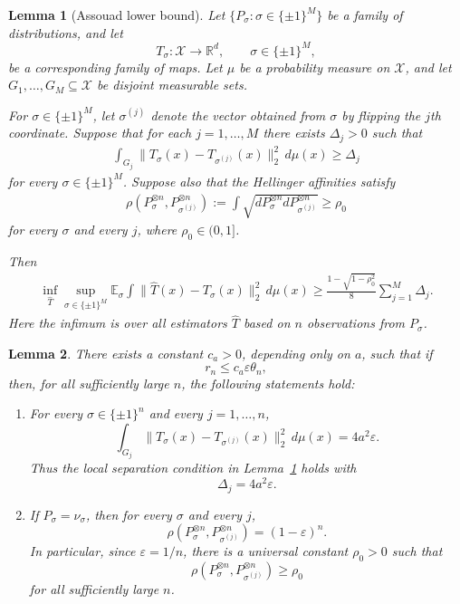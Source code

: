 \documentclass[10pt,a4paper]{amsart}
\newtheorem{lemma}{Lemma}
\begin{document}
\begin{lemma}[Assouad lower bound]
\label{lem:assouad-map-hellinger}
Let $\{P_\sigma:\sigma\in\{\pm1\}^M\}$ be a family of distributions, and let
\[
T_\sigma:\mathcal X\to\mathbb R^d,
\qquad \sigma\in\{\pm1\}^M,
\]
be a corresponding family of maps. Let $\mu$ be a probability measure on
$\mathcal X$, and let $G_1,\ldots,G_M\subseteq\mathcal X$ be disjoint
measurable sets.

For $\sigma\in\{\pm1\}^M$, let $\sigma^{(j)}$ denote the vector obtained
from $\sigma$ by flipping the $j$th coordinate. Suppose that for each
$j=1,\ldots,M$ there exists $\Delta_j>0$ such that
\begin{align}
\label{eq:assouad-local-separation}
\int_{G_j}
\|T_\sigma(x)-T_{\sigma^{(j)}}(x)\|_2^2\,d\mu(x)
\geq
\Delta_j
\end{align}
for every $\sigma\in\{\pm1\}^M$. Suppose also that the Hellinger
affinities satisfy
\begin{align}
\label{eq:assouad-affinity}
\rho(P_\sigma^{\otimes n},P_{\sigma^{(j)}}^{\otimes n})
:=
\int \sqrt{dP_\sigma^{\otimes n} dP^{\otimes n}_{\sigma^{(j)}}}
\geq
\rho_0
\end{align}
for every $\sigma$ and every $j$, where $\rho_0\in(0,1]$.

Then
\begin{align}
\label{eq:assouad-map-conclusion}
\inf_{\widehat T}
\sup_{\sigma\in\{\pm1\}^M}
\mathbb E_\sigma
\int
\|\widehat T(x)-T_\sigma(x)\|_2^2\,d\mu(x)
\geq
\frac{1-\sqrt{1-\rho_0^2}}{8}
\sum_{j=1}^M \Delta_j .
\end{align}
Here the infimum is over all estimators $\widehat T$ based on $n$ 
observations from $P_\sigma$.
\end{lemma}

\begin{lemma}
\label{lem:lower-bound-analysis}
There exists a constant $c_a>0$, depending only on $a$,
such that if
\[
r_n \leq c_a \varepsilon \theta_n,
\]
then, for all sufficiently large $n$, the following statements hold:
\begin{enumerate}

\item For every $\sigma\in\{\pm1\}^n$ and every $j=1,\ldots,n$,
\[
\int_{G_j}
\|T_\sigma(x)-T_{\sigma^{(j)}}(x)\|_2^2\,d\mu(x)
=
4a^2\varepsilon.
\]
Thus the local separation condition in Lemma~\ref{lem:assouad-map-hellinger}
holds with
\[
\Delta_j=4a^2\varepsilon.
\]

\item If $P_\sigma=\nu_\sigma$, then for every $\sigma$ and every $j$,
\[
\rho(P_\sigma^{\otimes n},P_{\sigma^{(j)}}^{\otimes n})
=
(1-\varepsilon)^n.
\]
In particular, since $\varepsilon=1/n$, there is a universal constant
$\rho_0>0$ such that
\[
\rho(P_\sigma^{\otimes n},P_{\sigma^{(j)}}^{\otimes n})
\geq \rho_0
\]
for all sufficiently large $n$.
\end{enumerate}
\end{lemma}
\end{document}
